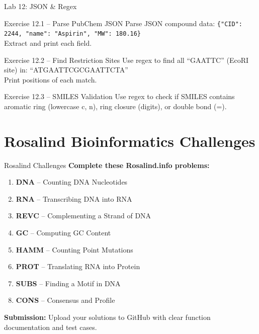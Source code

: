 \documentclass{beamer}
\begin{document}
\begin{frame}{\textcolor{labcolor}{Lab 12: JSON \& Regex}}
    \footnotesize
    \begin{block}{Exercise 12.1 -- Parse PubChem JSON}
        Parse JSON compound data:
        \texttt{\{"CID": 2244, "name": "Aspirin", "MW": 180.16\}}\\
        Extract and print each field.
    \end{block}
    \vspace{0.2em}
    \begin{block}{Exercise 12.2 -- Find Restriction Sites}
        Use regex to find all ``GAATTC'' (EcoRI site) in: ``ATGAATTCGCGAATTCTA''\\
        Print positions of each match.
    \end{block}
    \vspace{0.2em}
    \begin{block}{Exercise 12.3 -- SMILES Validation}
        Use regex to check if SMILES contains aromatic ring (lowercase c, n), ring closure (digits), or double bond (=).
    \end{block}
\end{frame}

\section{Rosalind Bioinformatics Challenges}

\begin{frame}{Rosalind Challenges}
    \footnotesize
    \textbf{Complete these Rosalind.info problems:}
    \vspace{0.3em}
    \begin{enumerate}\setlength{\itemsep}{0pt}
        \item \textbf{DNA} -- Counting DNA Nucleotides
        \item \textbf{RNA} -- Transcribing DNA into RNA
        \item \textbf{REVC} -- Complementing a Strand of DNA
        \item \textbf{GC} -- Computing GC Content
        \item \textbf{HAMM} -- Counting Point Mutations
        \item \textbf{PROT} -- Translating RNA into Protein
        \item \textbf{SUBS} -- Finding a Motif in DNA
        \item \textbf{CONS} -- Consensus and Profile
    \end{enumerate}
    \vspace{0.3em}
    \textbf{Submission:} Upload your solutions to GitHub with clear function documentation and test cases.
\end{frame}
\end{document}
